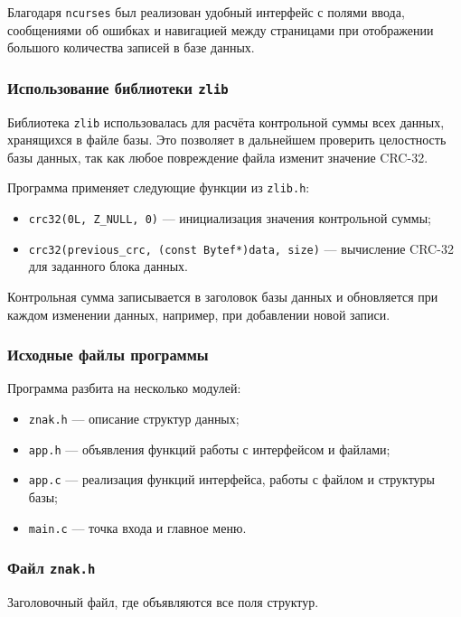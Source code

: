 Благодаря \texttt{ncurses} был реализован удобный интерфейс с полями ввода, сообщениями об ошибках и навигацией между страницами при отображении большого количества записей в базе данных.

\subsubsection{Использование библиотеки \texttt{zlib}}

Библиотека \texttt{zlib} использовалась для расчёта контрольной суммы всех данных, хранящихся в файле базы. Это позволяет в дальнейшем проверить целостность базы данных, так как любое повреждение файла изменит значение CRC-32.

Программа применяет следующие функции из \texttt{zlib.h}:
\begin{itemize}
    \item \texttt{crc32(0L, Z\_NULL, 0)} — инициализация значения контрольной суммы;
    \item \texttt{crc32(previous\_crc, (const Bytef*)data, size)} — вычисление CRC-32 для заданного блока данных.
\end{itemize}

Контрольная сумма записывается в заголовок базы данных и обновляется при каждом изменении данных, например, при добавлении новой записи.

\subsubsection{Исходные файлы программы}

Программа разбита на несколько модулей:

\begin{itemize}
    \item \texttt{znak.h} --- описание структур данных;
    \item \texttt{app.h} --- объявления функций работы с интерфейсом и файлами;
    \item \texttt{app.c} --- реализация функций интерфейса, работы с файлом и структуры базы;
    \item \texttt{main.c} --- точка входа и главное меню.
\end{itemize}

\subsubsection*{Файл \texttt{znak.h}}

\noindent
Заголовочный файл, где объявляются все поля структур. 

